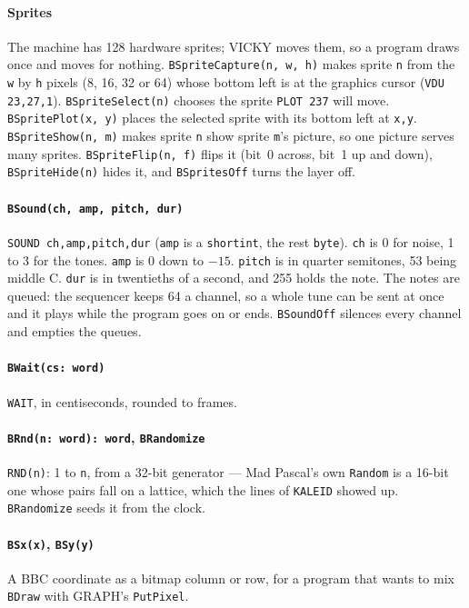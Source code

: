 \paragraph{Sprites} The machine has 128 hardware sprites; VICKY moves them, so
a program draws once and moves for nothing.
\verb|BSpriteCapture(n, w, h)| makes sprite \verb|n| from the \verb|w| by
\verb|h| pixels (8, 16, 32 or 64) whose bottom left is at the graphics cursor
(\verb|VDU 23,27,1|). \verb|BSpriteSelect(n)| chooses the sprite \verb|PLOT 237|
will move. \verb|BSpritePlot(x, y)| places the selected sprite with its
bottom left at \verb|x,y|. \verb|BSpriteShow(n, m)| makes sprite \verb|n|
show sprite \verb|m|'s picture, so one picture serves many sprites.
\verb|BSpriteFlip(n, f)| flips it (bit~0 across, bit~1 up and down),
\verb|BSpriteHide(n)| hides it, and \verb|BSpritesOff| turns the layer off.

\paragraph{\texttt{BSound(ch, amp, pitch, dur)}}
\verb|SOUND ch,amp,pitch,dur| (\verb|amp| is a \verb|shortint|, the rest \verb|byte|). \verb|ch| is 0 for noise, 1 to 3 for the
tones. \verb|amp| is 0 down to $-15$. \verb|pitch| is in quarter semitones, 53
being middle C. \verb|dur| is in twentieths of a second, and 255 holds the
note. The notes are queued: the sequencer keeps 64 a channel, so a whole tune
can be sent at once and it plays while the program goes on or ends.
\verb|BSoundOff| silences every channel and empties the queues.

\paragraph{\texttt{BWait(cs: word)}} \verb|WAIT|, in centiseconds, rounded to
frames.

\paragraph{\texttt{BRnd(n: word): word}, \texttt{BRandomize}} \verb|RND(n)|:
1 to \verb|n|, from a 32-bit generator --- Mad Pascal's own \verb|Random| is
a 16-bit one whose pairs fall on a lattice, which the lines of \texttt{KALEID}
showed up. \verb|BRandomize| seeds it from the clock.

\paragraph{\texttt{BSx(x)}, \texttt{BSy(y)}} A BBC coordinate as a bitmap
column or row, for a program that wants to mix \verb|BDraw| with GRAPH's
\verb|PutPixel|.

